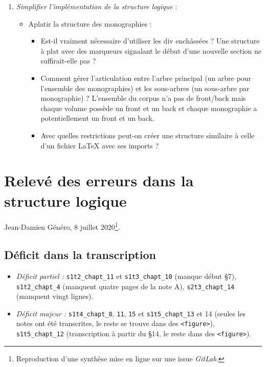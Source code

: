 \begin{enumerate}
    \item \textit{Simplifier l'implémentation de la structure logique} :
    \begin{itemize}
        \item Aplatir la structure des monographies :
        \begin{itemize}
            \item  Est-il vraiment nécessaire d'utiliser les div enchâssées ? Une structure à plat avec des marqueurs signalant le début d'une nouvelle section ne suffirait-elle pas ?
            \item  Comment gérer l'articulation entre l'arbre principal (un arbre pour l'ensemble des monographies) et les sous-arbres (un sous-arbre par monographie) ? L'ensemble du corpus n'a pas de front/back mais chaque volume possède un front et un back et chaque monographie a potentiellement un front et un back.
            \item  Avec quelles restrictions peut-on créer une structure similaire à celle d'un fichier \LaTeX{} avec ses imports ?
        \end{itemize}
    \end{itemize}
\end{enumerate}

\clearpage
\renewcommand{\thesection}{C.2}
\section{Relevé des erreurs dans la structure
logique}\label{ann:releve_erreurs}

Jean-Damien Généro, 8 juillet 2020\footnote{Reproduction d'une synthèse mise en ligne sur une issue \textit{GitLab}.}.

\subsection{Déficit dans la
transcription}\label{ann:deficit-transcr}

\begin{itemize}
\item
  \emph{Déficit partiel :} \texttt{s1t2\_chapt\_11} et \texttt{s1t3\_chapt\_10} (manque
  début §7), \texttt{s1t2\_ch\-apt\_4} (manquent quatre pages de la note A), \texttt{\texttt{s2t3\_chapt\_14}} (manquent vingt lignes).
\item
  \emph{Déficit majeur :} \texttt{s1t4\_chapt\_8}, \texttt{11}, \texttt{15} et \texttt{s1t5\_chapt\_13} et
  14 (seules les notes ont été transcrites, le reste se trouve dans des
  \texttt{\textless{}figure\textgreater{}}), \texttt{s1t5\_chapt\_12}
  (transcription à partir du §14, le reste dans des
  \texttt{\textless{}figure\textgreater{}}).
\end{itemize}

